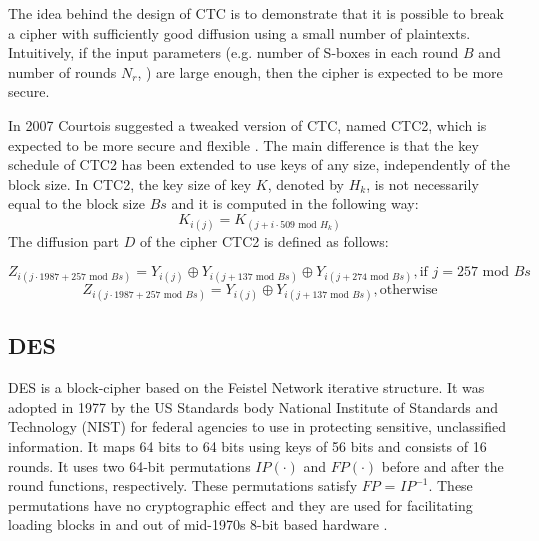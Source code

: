 The idea behind the design of CTC is to
demonstrate that it is possible to break a cipher with sufficiently good diffusion using
a small number of plaintexts. Intuitively, if the input parameters
(e.g. number of S-boxes in each round $B$ and number of rounds $N_r$, ) are large
enough, then the cipher is expected to be more secure.

In 2007 Courtois suggested a tweaked version of CTC, named CTC2, which is expected to be more secure and flexible \cite{courtois2007ctc2}. The main difference is that the key schedule of CTC2 has been extended to use keys of any size, independently of the block size. In CTC2, the key size of key $K$, denoted by $H_k$, is not necessarily equal to the block size $Bs$ and it is computed in the following way:
\begin{equation}
K_{i(j)} = K_{(j+i \cdot 509 \text{ mod } H_k)}
\end{equation}
The diffusion part $D$ of the cipher CTC2 is defined as follows:

\begin{equation}
Z_{i(j \cdot 1987 + 257 \text{ mod } Bs)} = Y_{i(j)} \oplus Y_{i(j+137 \text{ mod } Bs)} \oplus Y_{i(j+274 \text{ mod } Bs)}, \text{if } j = 257 \text{ mod } Bs
\end{equation}
\begin{equation}
Z_{i(j \cdot 1987 + 257 \text{ mod } Bs)} = Y_{i(j)} \oplus Y_{i(j+137 \text{ mod } Bs)} , \text{otherwise}
\end{equation}

\subsection{DES}
DES is a block-cipher based on the Feistel Network iterative structure. It was adopted in 1977 by the US Standards body National Institute of Standards and Technology (NIST) for federal agencies to use in protecting sensitive, unclassified information. It maps 64 bits to 64 bits using keys of 56 bits and consists of 16 rounds. It uses two 64-bit permutations $IP(\cdot)$ and $FP(\cdot)$ before and after the round functions, respectively. These permutations satisfy $FP$ = $IP^{-1}$. These permutations have no cryptographic effect and they are used for facilitating loading blocks in and out of mid-1970s 8-bit based hardware \cite{schneier1996applied}.

